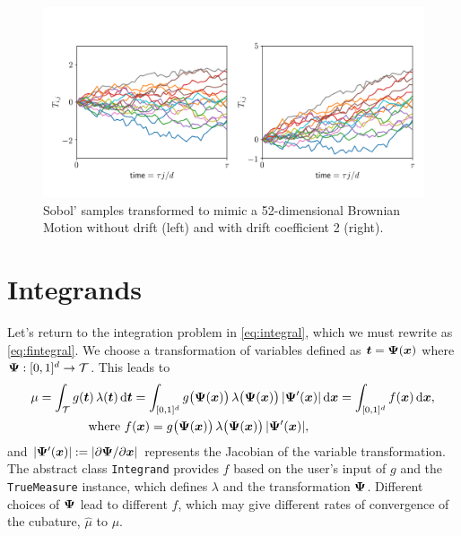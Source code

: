 \documentclass[graybox,footinfo]{svmult}
\newcommand{\QMCPYabs}[1]{\ensuremath{{\left \lvert #1 \right \rvert}}}
\newcommand{\hmu}{\widehat{\mu}}
\newcommand{\cube}{[0,1]^d}
\begin{document}
\begin{figure}[t]
	\includegraphics[width=1\textwidth]{QMCSoftwareArticle/figs/tm_bm.png} 
	\caption{Sobol' samples transformed to mimic a 52-dimensional Brownian Motion without drift (left) and with drift coefficient 2 (right).}
	\label{fig:tm_bm}
\end{figure}

\section{Integrands}

Let's return  to the integration problem in \eqref{eq:integral}, which we must rewrite as \eqref{eq:fintegral}.  We choose a transformation of variables defined as ${\boldsymbol{t}} = {\boldsymbol{\Psi}}({\boldsymbol{x}})$ where $\bsPsi:\cube \to \calT$.  This leads to 
\begin{align}
	\nonumber 
 \mu &= \int_\calT g(\bst) \, \lambda(\bst) \, \D \bst  = \int_{\cube} g\bigl(\bsPsi(\bsx)\bigr) \, \lambda\bigl(\bsPsi(\bsx)\bigr) \,\QMCPYabs{\bsPsi'(\bsx)}  \, \D \bsx =  \int_{\cube}f(\bsx) \, \D \bsx,  \\
 \label{eq:transVar}
  & \qquad \qquad \text{where } f(\bsx)  = g\bigl(\bsPsi(\bsx)\bigr)  \, \lambda\bigl(\bsPsi(\bsx)\bigr) \,\QMCPYabs{\bsPsi'(\bsx)} ,
\end{align}
and $\QMCPYabs{\bsPsi'(\bsx)} := \QMCPYabs{\partial \bsPsi/\partial \bsx}$ represents the Jacobian of the variable transformation.  The abstract class \texttt{Integrand} provides $f$ based on the user's input of $g$ and the \texttt{TrueMeasure} instance, which defines $\lambda$ and the transformation ${\boldsymbol{\Psi}}$. Different choices of ${\boldsymbol{\Psi}}$ lead to different $f$, which may give different rates of convergence of the cubature, $\hmu$ to $\mu$.
\end{document}
